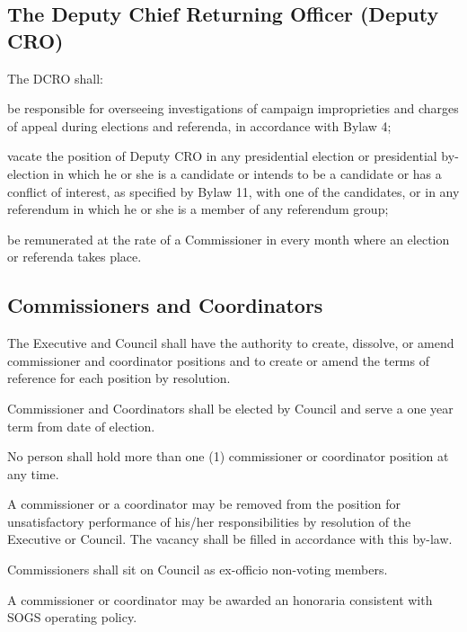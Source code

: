 \subsection {The Deputy Chief Returning Officer (Deputy CRO)} 
\begin{longenum}[ label*=\thesubsection.\arabic*., align=left]
	\item The DCRO shall: 
    \begin{longenum}[ label*=\arabic*., align=left]
		\item be responsible for overseeing investigations of campaign improprieties and charges of appeal during elections and referenda, in accordance with Bylaw 4;
        \item vacate the position of Deputy CRO in any presidential election or presidential by-election in which he or she is a candidate or intends to be a candidate or has a conflict of interest, as specified by Bylaw 11, with one of the candidates, or in any referendum in which he or she is a member of any referendum group; 
        \item be remunerated at the rate of a Commissioner in every month where an election or referenda takes place.
	\end{longenum}    
\end{longenum}
\subsection {Commissioners and Coordinators} 
\begin{longenum}[ label*=\thesubsection.\arabic*., align=left]
	\item The Executive and Council shall have the authority to create, dissolve, or amend commissioner and coordinator positions and to create or amend the terms of reference for each position by resolution. 
    \item Commissioner and Coordinators shall be elected by Council and serve a one year term from date of election. 
    \item No person shall hold more than one (1) commissioner or coordinator position at any time.
    \item A commissioner or a coordinator may be removed from the position for unsatisfactory performance of his/her responsibilities by resolution of the Executive or Council. The vacancy shall be filled in accordance with this by-law.  
    \item Commissioners shall sit on Council as ex-officio non-voting members.
    
    \item A commissioner or coordinator may be awarded an honoraria consistent with SOGS operating policy.
\end{longenum}

